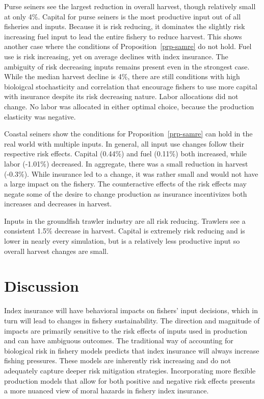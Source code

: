 \documentclass[
  letterpaper,
  DIV=11,
  numbers=noendperiod]{scrartcl}
\theoremstyle{plain}
\theoremstyle{plain}
\theoremstyle{remark}
\begin{document}
Purse seiners see the largest reduction in overall harvest, though
relatively small at only 4\%. Capital for purse seiners is the most
productive input out of all fisheries and inputs. Because it is risk
reducing, it dominates the slightly risk increasing fuel input to lead
the entire fishery to reduce harvest. This shows another case where the
conditions of Proposition~\ref{prp-samre} do not hold. Fuel use is risk
increasing, yet on average declines with index insurance. The ambiguity
of risk decreasing inputs remains present even in the strongest case.
While the median harvest decline is 4\%, there are still conditions with
high bioloigcal stochasticity and correlation that encourage fishers to
use more capital with insurance despite its risk decreasing nature.
Labor allocations did not change. No labor was allocated in either
optimal choice, because the production elasticity was negative.

Coastal seiners show the conditions for Proposition~\ref{prp-samre} can
hold in the real world with multiple inputs. In general, all input use
changes follow their respective risk effects. Capital (0.44\%) and fuel
(0.11\%) both increased, while labor (-1.01\%) decreased. In aggregate,
there was a small reduction in harvest (-0.3\%). While insurance led to
a change, it was rather small and would not have a large impact on the
fishery. The counteractive effects of the risk effects may negate some
of the desire to change production as insurance incentivizes both
increases and decreases in harvest.

Inputs in the groundfish trawler industry are all risk reducing.
Trawlers see a consistent 1.5\% decrease in harvest. Capital is
extremely risk reducing and is lower in nearly every simulation, but is
a relatively less productive input so overall harvest changes are small.

\hypertarget{sec-disc}{%
\section{Discussion}\label{sec-disc}}

Index insurance will have behavioral impacts on fishers' input
decisions, which in turn will lead to changes in fishery sustainability.
The direction and magnitude of impacts are primarily sensitive to the
risk effects of inputs used in production and can have ambiguous
outcomes. The traditional way of accounting for biological risk in
fishery models predicts that index insurance will always increase
fishing pressures. These models are inherently risk increasing and do
not adequately capture deeper risk mitigation strategies. Incorporating
more flexible production models that allow for both positive and
negative risk effects presents a more nuanced view of moral hazards in
fishery index insurance.
\end{document}
